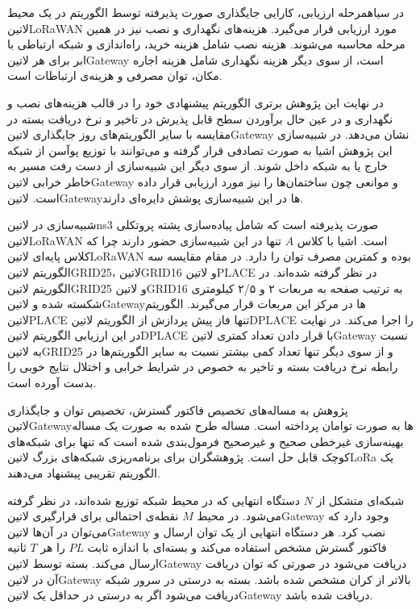  در ‌سیاه{مرحله ارزیابی}، کارایی جایگذاری صورت پذیرفته توسط الگوریتم در یک محیط ‌لاتین{LoRaWAN} مورد ارزیابی قرار می‌گیرد.
هزینه‌های نگهداری و نصب نیز در همین مرحله محاسبه می‌شوند. هزینه نصب شامل هزینه خرید، راه‌اندازی و شبکه ارتباطی با ابر برای هر ‌لاتین{Gateway}
است، از سوی دیگر هزینه نگهداری شامل هزینه اجاره مکان، توان مصرفی و هزینه‌ی ارتباطات است.


در نهایت این پژوهش برتری الگوریتم پیشنهادی خود را در قالب هزینه‌های نصب و نگهداری و در عین حال برآوردن سطح قابل پذیرش در تاخیر و نرخ دریافت بسته
در مقایسه با سایر الگوریتم‌های روز جایگذاری ‌لاتین{Gateway} نشان می‌دهد. در شبیه‌سازی این پژوهش اشیا به صورت تصادفی قرار گرفته و می‌توانند با توزیع پوآسن از شبکه خارج یا به شبکه داخل شوند.
از سوی دیگر این شبیه‌سازی از دست رفت مسیر به خاطر خرابی ‌لاتین{Gateway} و موانعی چون ساختمان‌ها را نیز مورد ارزیابی قرار داده است.
‌لاتین{Gateway}ها در این شبیه‌سازی پوشش دایره‌ای دارند.

شبیه‌سازی در ‌لاتین{ns3} صورت پذیرفته است که شامل پیاده‌سازی پشته پروتکلی ‌لاتین{LoRaWAN} است.
اشیا با کلاس $A$ تنها در این شبیه‌سازی حضور دارند چرا که کلاس پایه‌ای ‌لاتین{LoRaWAN} بوده و کمترین مصرف توان را دارد.
در مقام مقایسه سه الگوریتم ‌لاتین{GRID25}، ‌لاتین{GRID16} و ‌لاتین{PLACE} در نظر گرفته شده‌اند.
در الگوریتم ‌لاتین{GRID25} و ‌لاتین{GRID16} به ترتیب صفحه به مربعات ۲ و ۲/۵ کیلومتری شکسته شده و ‌لاتین{Gateway}ها
در مرکز این مربعات قرار می‌گیرند. الگوریتم ‌لاتین{PLACE} تنها فاز پیش پردازش از الگوریتم ‌لاتین{DPLACE} را اجرا می‌کند.
در نهایت در این ارزیابی الگوریتم ‌لاتین{DPLACE} با قرار دادن تعداد کمتری ‌لاتین{Gateway} نسبت به ‌لاتین{GRID25}
و از سوی دیگر تنها تعداد کمی بیشتر نسبت به سایر الگوریتم‌ها در رابطه نرخ دریافت بسته و تاخیر به خصوص در شرایط خرابی و اختلال
نتایج خوبی را بدست آورده است.


پژوهش  به مساله‌های تخصیص فاکتور گسترش، تخصیص توان و جایگذاری ‌لاتین{Gateway}ها به صورت توامان پرداخته است.
مساله طرح شده به صورت یک مساله بهینه‌سازی غیرخطی صحیح و غیرصحیح فرمول‌بندی شده است که تنها برای شبکه‌های کوچک قابل حل است.
پژوهشگران برای برنامه‌ریزی شبکه‌های بزرگ ‌لاتین{LoRa} یک الگوریتم تقریبی پیشنهاد می‌دهند.

شبکه‌ای متشکل از $N$ دستگاه انتهایی که در محیط شبکه توزیع شده‌اند، در نظر گرفته می‌شود.
در محیط $M$ نقطه‌ی احتمالی برای قرارگیری ‌لاتین{Gateway} وجود دارد که می‌توان در آن‌ها ‌لاتین{Gateway} نصب کرد.
هر دستگاه انتهایی از یک توان ارسال و فاکتور گسترش مشخص استفاده می‌کند و بسته‌ای با اندازه ثابت $PL$ را هر $T$ ثانیه ارسال می‌کند.
بسته توسط ‌لاتین{Gateway} دریافت می‌شود در صورتی که توان دریافت آن در ‌لاتین{Gateway} بالاتر از کران مشخص شده باشد.
بسته به درستی در سرور شبکه دریافت می‌شود اگر به درستی در حداقل یک ‌لاتین{Gateway} دریافت شده باشد.

